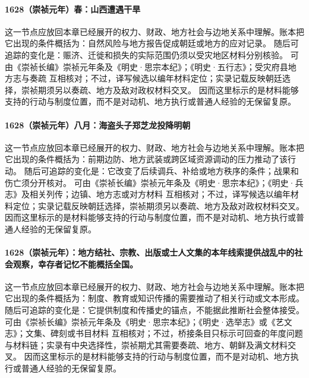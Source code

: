 \paragraph{1628（崇祯元年）春：山西遭遇干旱} 这一节点应放回本章已经展开的权力、财政、地方社会与边地关系中理解。账本把它出现的条件概括为：自然风险与地方报告促成朝廷或地方的应对记录。 随后可追踪的变化是：赈济、迁徙和损失的实际范围仍须以受灾地区材料分别核验。 可由《崇祯长编》崇祯元年条及《明史·思宗本纪》；《明史·五行志》；受灾府县地方志与奏疏 互相核对；不过，译写候选以编年材料定位；实录记载反映朝廷选择，崇祯期须另以奏疏、地方及敌对政权材料交叉。 因而这里标示的是材料能够支持的行动与制度位置，而不是对动机、地方执行或普通人经验的无保留复原。

\paragraph{1628（崇祯元年）八月：海盗头子郑芝龙投降明朝} 这一节点应放回本章已经展开的权力、财政、地方社会与边地关系中理解。账本把它出现的条件概括为：前期边防、地方武装或跨区域资源调动的压力推动了该行动。 随后可追踪的变化是：它改变了后续调兵、补给或地方秩序的条件；战果和伤亡须分开核对。 可由《崇祯长编》崇祯元年条及《明史·思宗本纪》；《明史·兵志》及相关列传；边镇、地方志或对方材料 互相核对；不过，译写候选以编年材料定位；实录记载反映朝廷选择，崇祯期须另以奏疏、地方及敌对政权材料交叉。 因而这里标示的是材料能够支持的行动与制度位置，而不是对动机、地方执行或普通人经验的无保留复原。

\paragraph{1628（崇祯元年）：地方结社、宗教、出版或士人文集的本年线索提供战乱中的社会观察，幸存者记忆不能概括全国。} 这一节点应放回本章已经展开的权力、财政、地方社会与边地关系中理解。账本把它出现的条件概括为：制度、教育或知识传播的需要推动了相关行动或文本形成。 随后可追踪的变化是：它提供制度和传播史的锚点，不能据此推断社会整体接受。 可由《崇祯长编》崇祯元年条及《明史·思宗本纪》；《明史·选举志》或《艺文志》；文集、碑刻或书目材料 互相核对；不过，桥接条目只标示可回查的年度问题与材料链；实录有中央选择性，崇祯期尤其需要奏疏、地方、朝鲜及满文材料交叉。 因而这里标示的是材料能够支持的行动与制度位置，而不是对动机、地方执行或普通人经验的无保留复原。

